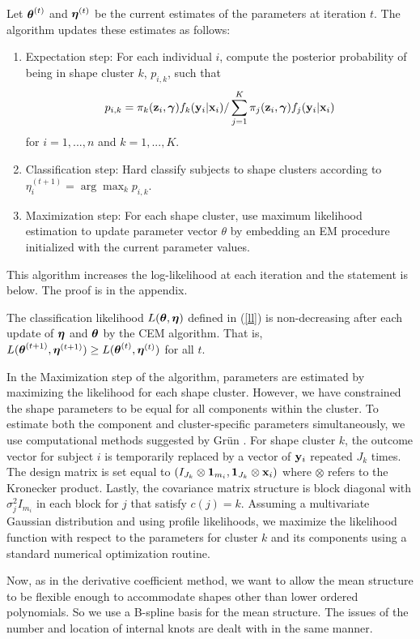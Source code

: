Let $\boldsymbol\theta^{(t)}$ and $\boldsymbol\eta^{(t)}$ be the current estimates of the parameters at iteration $t$. The algorithm updates these estimates as follows:
\begin{enumerate}
\item Expectation step: For each individual $i$, compute the posterior probability of being in shape cluster $k$, $p_{i,k}$, such that
$$p_{i,k}= \pi_{k}(\mathbf z_{i},\boldsymbol\gamma)f_{k}(\mathbf y_{i}|\mathbf x_{i})/\sum^{K}_{j=1} \pi_{j}(\mathbf z_{i},\boldsymbol\gamma)f_{j}(\mathbf y_{i}|\mathbf x_{i})$$
for $i=1,...,n$ and $k=1,...,K$.
\item Classification step: Hard classify subjects to shape clusters according to $\eta^{(t+1)}_{i} = \arg\max_{k} p_{i,k}$.
\item Maximization step: For each shape cluster, use maximum likelihood estimation to update parameter vector $\theta$ by embedding an EM procedure initialized with the current parameter values.
\end{enumerate} 
This algorithm increases the log-likelihood at each iteration and the statement is below. The proof is in the appendix. 
\begin{theorem} The classification likelihood $L(\boldsymbol\theta,\boldsymbol\eta)$ defined in (\ref{ll}) is non-decreasing after each update of $\boldsymbol\eta$ and $\boldsymbol\theta$ by the CEM algorithm. That is, $L(\boldsymbol\theta^{(t+1)},\boldsymbol\eta^{(t+1)}) \geq L(\boldsymbol\theta^{(t)},\boldsymbol\eta^{(t)})$ for all $t$.
\end{theorem}

In the Maximization step of the algorithm, parameters are estimated by maximizing the likelihood for each shape cluster. However, we have constrained the shape parameters to be equal for all components within the cluster. To estimate both the component and cluster-specific parameters simultaneously, we use computational methods suggested by Gr{\"u}n \cite{grun2008}. For shape cluster $k$, the outcome vector for subject $i$ is temporarily replaced by a vector of $\mathbf y_{i}$ repeated $J_{k}$ times. The design matrix  is set equal to $(I_{J_{k}}\otimes \boldsymbol 1_{m_{i}}, \boldsymbol 1_{J_{k}} \otimes \mathbf x_{i})$ where $\otimes$ refers to the Kronecker product. Lastly, the covariance matrix structure is block diagonal with $\sigma^{2}_{j}I_{m_{i}}$ in each block for $j$ that satisfy $c(j)=k$. Assuming a multivariate Gaussian distribution and using profile likelihoods, we maximize the likelihood function with respect to the parameters for cluster $k$ and its components using a standard numerical optimization routine.

Now, as in the derivative coefficient method, we want to allow the mean structure to be flexible enough to accommodate shapes other than lower ordered polynomials. So we use a B-spline basis for the mean structure. The issues of the number and location of internal knots are dealt with in the same manner.

